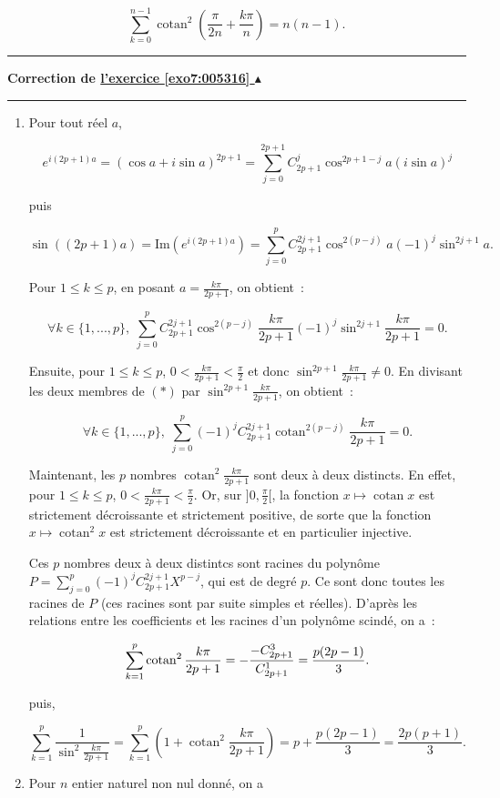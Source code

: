 \documentclass[11pt,a4paper]{article}
\newcommand{\cotan}{\mathop{\mathrm{cotan}}\nolimits}
\newcounter{exo}
\newcommand{\correction}[1]{\hypertarget{cor7:#1}{}\label{cor7:#1}{\bf Correction de \hyperlink{exo7:#1}{l'exercice \ref{exo7:#1} $\blacktriangle$}}\vspace{1mm}\hrule\vspace{1mm}}
\newcommand{\fincorrection}{\vspace{1mm}\hrule\vspace*{7mm}}
\begin{document}
$$\sum_{k=0}^{n-1}\cotan^2(\frac{\pi}{2n}+\frac{k\pi}{n})=n(n-1).$$
\fincorrection
\correction{005316}
\begin{enumerate}
\item  Pour tout réel $a$,

$$e^{i(2p+1)a}=(\cos a+i\sin a)^{2p+1}=\sum_{j=0}^{2p+1}C_{2p+1}^{j}\cos^{2p+1-j}a(i\sin a)^j$$

puis 

$$\sin((2p+1)a)=\mbox{Im}(e^{i(2p+1)a})=\sum_{j=0}^{p}C_{2p+1}^{2j+1}\cos^{2(p-j)}a(-1)^j\sin^{2j+1}a.$$

Pour $1\leq k\leq p$, en posant $a=\frac{k\pi}{2p+1}$, on obtient~: 

$$\forall k\in\{1,...,p\},\;\sum_{j=0}^{p}C_{2p+1}^{2j+1}\cos^{2(p-j)}\frac{k\pi}{2p+1}(-1)^j\sin^{2j+1}
\frac{k\pi}{2p+1}=0.$$
 
Ensuite, pour $1\leq k\leq p$, $0<\frac{k\pi}{2p+1}<\frac{\pi}{2}$ et donc $\sin^{2p+1}
\frac{k\pi}{2p+1}\neq0$. En divisant les deux membres de $(*)$ par $\sin^{2p+1}
\frac{k\pi}{2p+1}$, on obtient~:

$$\forall k\in\{1,...,p\},\;\sum_{j=0}^{p}(-1)^jC_{2p+1}^{2j+1}\cotan^{2(p-j)}\frac{k\pi}{2p+1}=0.$$

Maintenant, les $p$ nombres $\cotan^2\frac{k\pi}{2p+1}$ sont deux à deux distincts. En effet, pour $1\leq k\leq p$, $0<\frac{k\pi}{2p+1}<\frac{\pi}{2}$. Or, sur $]0,\frac{\pi}{2}[$, la fonction $x\mapsto\cotan x$ est strictement décroissante et strictement positive, de sorte que la fonction $x\mapsto\cotan^2x$ est strictement décroissante et en particulier injective.

Ces $p$ nombres deux à deux distintcs sont racines du polynôme $P=\sum_{j=0}^{p}(-1)^jC_{2p+1}^{2j+1}X^{p-j}$, qui est de degré $p$. Ce sont donc toutes les racines de $P$ (ces racines sont par suite simples et réelles). D'après les relations entre les coefficients et les racines d'un polynôme scindé, on a~:

\begin{align*}\ensuremath
\sum_{k=1}^{p}\cotan^2\frac{k\pi}{2p+1}=-\frac{-C_{2p+1}^3}{C_{2p+1}^1}=\frac{p(2p-1)}{3}.
\end{align*}

puis,

$$\sum_{k=1}^{p}\frac{1}{\sin^2\frac{k\pi}{2p+1}}=\sum_{k=1}^{p}(1+\cotan^2\frac{k\pi}{2p+1})=p+\frac{p(2p-1)}{3}=\frac{2p(p+1)}{3}.$$

\item  Pour $n$ entier naturel non nul donné, on a


\end{enumerate}
\end{document}
